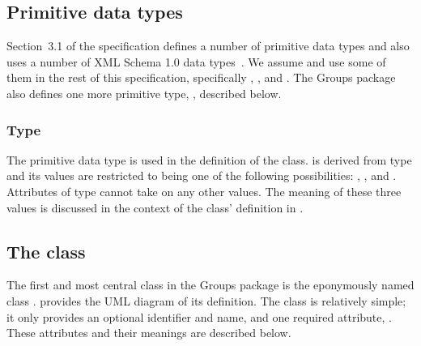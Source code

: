 \subsection{Primitive data types}
\label{new-primitive-types}

Section~3.1 of the \sbmlthreecore specification defines a number of primitive data types and also uses a number of XML Schema 1.0 data types~\citep{biron:2000}.  We assume and use some of them in the rest of this specification, specifically , , and .  The Groups package also defines one more primitive type, , described below.


\subsubsection{Type \fixttspace{}}
\label{primtype-groupkind}

The  primitive data type is used in the definition of the \Group class.   is derived from type  and its values are restricted to being one of the following possibilities: , , and .  Attributes of type  cannot take on any other values.  The meaning of these three values is discussed in the context of the \Group class' definition in .


\subsection{The  class}
\label{group-class}
\label{listofmembers-class}

The first and most central class in the Groups package is the eponymously named class \Group.   provides the UML diagram of its definition.  The \Group class is relatively simple; it only provides an optional identifier and name, and one required attribute, .  These attributes and their meanings are described below.

